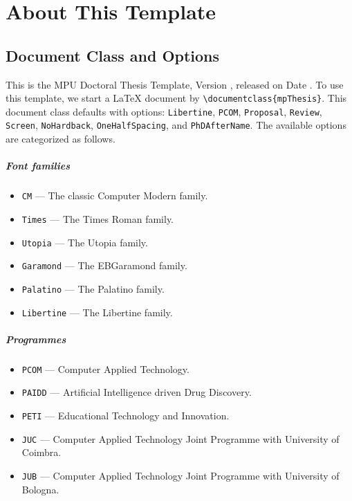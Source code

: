 \chapter{About This Template}\label{ch:template}
\minitoc

\makeatletter
\newcommand*{\NimbusMonoN@scale}{0.9}
\let\ttdefault@save\ttdefault
\renewcommand*{\ttdefault}{NimbusMonoN}
\newcommand{\InsertTemplateVersion}{\mp@thesis@class@version}
\newcommand{\InsertTemplateDate}{\mp@thesis@class@date}
\makeatother
\newcommand{\optna}[1]{{\tt#1}}
\newcommand{\mana}[1]{\optna{\textbackslash#1}}
\newcommand{\DeBu}{\mbox{$\dagger$}}

\section{Document Class and Options}

This is the MPU Doctoral Thesis Template, Version {\em\InsertTemplateVersion}, released on Date {\em\InsertTemplateDate}.
To use this template, we start a {\LaTeX} document by \mana{documentclass\{mpThesis\}}.
This document class defaults with options: \optna{Libertine}, \optna{PCOM}, \optna{Proposal}, \optna{Review}, \optna{Screen}, \optna{NoHardback}, \optna{OneHalfSpacing}, and \optna{PhDAfterName}.
The available options are categorized as follows.

\paragraph{Font families}
\begin{itemize}[noitemsep]
\item \optna{CM} --- The classic Computer Modern family.
\item \optna{Times} --- The Times Roman family.
\item \optna{Utopia} --- The Utopia family.
\item \optna{Garamond} --- The EBGaramond family.
\item \optna{Palatino} --- The Palatino family.
\item[\DeBu] \optna{Libertine} --- The Libertine family.
\end{itemize}

\paragraph{Programmes}
\begin{itemize}[noitemsep]
\item[\DeBu] \optna{PCOM} --- Computer Applied Technology.
\item \optna{PAIDD} --- Artificial Intelligence driven Drug Discovery.
\item \optna{PETI} --- Educational Technology and Innovation.
\item \optna{JUC} --- Computer Applied Technology Joint Programme with University of Coimbra.
\item \optna{JUB} --- Computer Applied Technology Joint Programme with University of Bologna.
\end{itemize}

